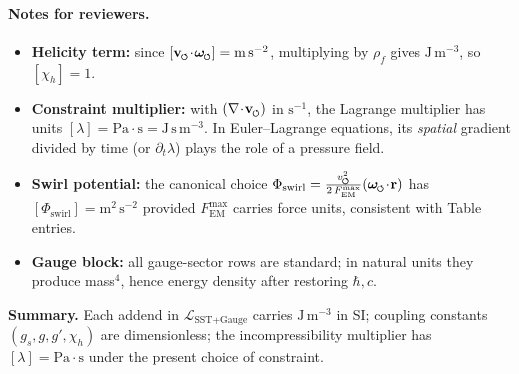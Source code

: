 \documentclass[11pt]{article}
\newcommand{\swirlarrow}{%
     \mathchoice{\mkern-2mu\scriptstyle\boldsymbol{\circlearrowleft}}%
                {\mkern-2mu\scriptstyle\boldsymbol{\circlearrowleft}}%
                {\mkern-2mu\scriptscriptstyle\boldsymbol{\circlearrowleft}}%
                {\mkern-2mu\scriptscriptstyle\boldsymbol{\circlearrowleft}}%
}
\newcommand{\vswirl}{\mathbf{v}_{\swirlarrow}}
\newcommand{\omegas}{\boldsymbol{\omega}_{\swirlarrow}}  %
\newcommand{\vscore}{v_{\swirlarrow}}                    %
\newcommand{\rhof}{\rho_{\!f}}                           %
\newcommand{\FmaxEM}{F_{\mathrm{EM}}^{\max}}             %
\begin{document}
\paragraph{Notes for reviewers.}
\begin{itemize}
	\item \textbf{Helicity term:} since $[\vswirl\!\cdot\!\omegas]=\mathrm{m\,s^{-2}}$, multiplying by $\rhof$ gives $\mathrm{J\,m^{-3}}$, so $[\chi_h]=1$.
	\item \textbf{Constraint multiplier:} with $(\nabla\!\cdot\!\vswirl)$ in $\mathrm{s^{-1}}$, the Lagrange multiplier has units $[\lambda]=\mathrm{Pa\cdot s}=\mathrm{J\,s\,m^{-3}}$. In Euler–Lagrange equations, its \emph{spatial} gradient divided by time (or $\partial_t\lambda$) plays the role of a pressure field.
	\item \textbf{Swirl potential:} the canonical choice $\Phi_{\text{swirl}}=\frac{\vscore^{2}}{2\,\FmaxEM}(\omegas\!\cdot\!\mathbf r)$ has $[\Phi_{\text{swirl}}]=\mathrm{m^2\,s^{-2}}$ provided $\FmaxEM$ carries force units, consistent with Table entries.
	\item \textbf{Gauge block:} all gauge-sector rows are standard; in natural units they produce mass$^4$, hence energy density after restoring $\hbar,c$.
\end{itemize}

\noindent\textbf{Summary.} Each addend in $\mathcal L_{\text{SST+Gauge}}$ carries $\mathrm{J\,m^{-3}}$ in SI; coupling constants \((g_s,g,g',\chi_h)\) are dimensionless; the incompressibility multiplier has $[\lambda]=\mathrm{Pa\cdot s}$ under the present choice of constraint.

\nocite{*}


\end{document}

